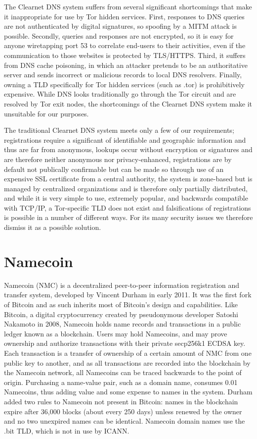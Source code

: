 The Clearnet DNS system suffers from several significant shortcomings that make it inappropriate for use by Tor hidden services. First, responses to DNS queries are not authenticated by digital signatures, so spoofing by a MITM attack is possible. Secondly, queries and responses are not encrypted, so it is easy for anyone wiretapping port 53 to correlate end-users to their activities, even if the communication to those websites is protected by TLS/HTTPS. Third, it suffers from DNS cache poisoning, in which an attacker pretends to be an authoritative server and sends incorrect or malicious records to local DNS resolvers. Finally, owning a TLD specifically for Tor hidden services (such as .tor) is prohibitively expensive. While DNS looks traditionally go through the Tor circuit and are resolved by Tor exit nodes, the shortcomings of the Clearnet DNS system make it unsuitable for our purposes.

The traditional Clearnet DNS system meets only a few of our requirements; registrations require a significant of identifiable and geographic information and thus are far from anonymous, lookups occur without encryption or signatures and are therefore neither anonymous nor privacy-enhanced, registrations are by default not publically confirmable but can be made so through use of an expensive SSL certificate from a central authority, the system is zone-based but is managed by centralized organizations and is therefore only partially distributed, and while it is very simple to use, extremely popular, and backwards compatible with TCP/IP, a Tor-specific TLD does not exist and falsifications of registrations is possible in a number of different ways. For its many security issues we therefore dismiss it as a possible solution.



\section{Namecoin}

Namecoin (NMC) is a decentralized peer-to-peer information registration and transfer system, developed by Vincent Durham in early 2011. It was the first fork of Bitcoin and as such inherits most of Bitcoin's design and capabilities. Like Bitcoin, a digital cryptocurrency created by pseudonymous developer Satoshi Nakamoto in 2008, Namecoin holds name records and transactions in a public ledger known as a blockchain. Users may hold Namecoins, and may prove ownership and authorize transactions with their private secp256k1 ECDSA key. Each transaction is a transfer of ownership of a certain amount of NMC from one public key to another, and as all transactions are recorded into the blockchain by the Namecoin network, all Namecoins can be traced backwards to the point of origin. Purchasing a name-value pair, such as a domain name, consumes 0.01 Namecoins, thus adding value and some expense to names in the system. Durham added two rules to Namecoin not present in Bitcoin: names in the blockchain expire after 36,000 blocks (about every 250 days) unless renewed by the owner and no two unexpired names can be identical. Namecoin domain names use the .bit TLD, which is not in use by ICANN.

